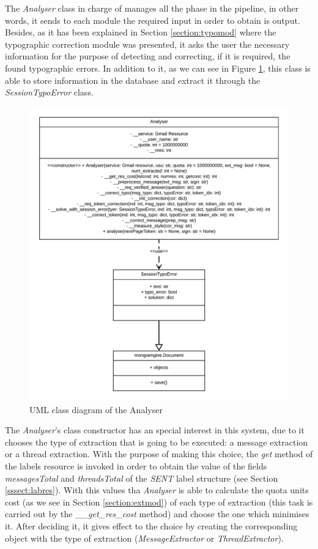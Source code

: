 The \textit{Analyser} class in charge of manages all the phase in the pipeline, in other words, it sends to each module the required input in order to obtain is output. Besides, as it has been explained in Section \ref{section:typomod} where the typographic correction module was presented, it asks the user the necessary information for the purpose of detecting and correcting, if it is required, the found typographic errors. In addition to it, as we can see in Figure \ref{fig:umlanalyser}, this class is able to store information in the database and extract it through the \textit{SessionTypoError} class.

\begin{figure}[h]
	\centering%
	\centerline{\includegraphics[width=0.6\paperwidth]{Imagenes/Bitmap/analyserUML.png}}%
	\caption{UML class diagram of the Analyser}%
	\label{fig:umlanalyser}
\end{figure}

The \textit{Analyser}'s class constructor has an special interest in this system, due to it chooses the type of extraction that is going to be executed: a message extraction or a thread extraction. With the purpose of making this choice, the \textit{get} method of the labels resource is invoked in order to obtain the value of the fields \textit{messagesTotal} and \textit{threadsTotal} of the \textit{SENT} label structure (see Section \ref{sssect:labres}). With this values tha \textit{Analyser} is able to calculate the quota units cost (as we see in Section \ref{section:extmod}) of each type of extraction (this task is carried out by the \textit{\_\_get\_res\_cost} method) and choose the one which minimises it. After deciding it, it gives effect to the choice by creating the corresponding object with the type of extraction (\textit{MessageExtractor} or \textit{ThreadExtractor}).

